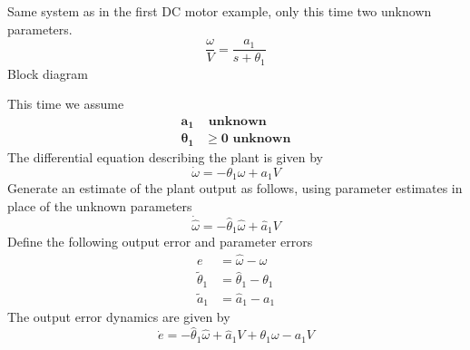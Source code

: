 \begin{example}\label{ex:dcmotor_multiparam_error3}
  Same system as in the first DC motor example, only this time two unknown parameters.
  \begin{equation*}
    \frac{\omega}{V}=\frac{a_{1}}{s+\theta_{1}}
  \end{equation*}
  Block diagram
  \begin{center}
  \end{center}
  This time we assume
  \begin{align*}
    \boldsymbol{a_{1}}&\textbf{~unknown} \\
    \boldsymbol{\theta_{1}}&\boldsymbol{\geq0}\textbf{~unknown}
  \end{align*}
  The differential equation describing the plant is given by
  \begin{equation*}
    \dot{\omega} = -\theta_{1}\omega + a_{1}V
  \end{equation*}
  Generate an estimate of the plant output as follows, using parameter estimates in place of the unknown parameters
  \begin{equation*}
    \dot{\hat{\omega}} = -\hat{\theta}_{1}\hat{\omega} + \hat{a}_{1}V
  \end{equation*}
  Define the following output error and parameter errors
  \begin{equation*}
    \begin{split}
      e &= \hat{\omega} - \omega \\
      \tilde{\theta}_{1} &= \hat{\theta}_{1} - \theta_{1} \\
      \tilde{a}_{1} &= \hat{a}_{1} - a_{1}
    \end{split}
  \end{equation*}
  The output error dynamics are given by
  \begin{equation*}
    \dot{e} = -\hat{\theta}_{1}\hat{\omega} + \hat{a}_{1}V + \theta_{1}\omega - a_{1}V

\end{equation*}
\end{example}
